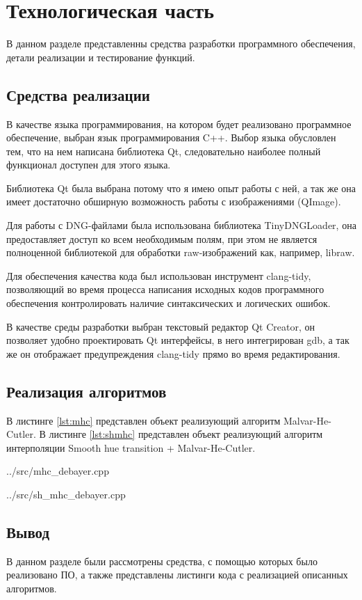 \chapter{Технологическая часть}

В данном разделе представленны средства разработки программного обеспечения, детали реализации и тестирование функций.

\section{Средства реализации}

В качестве языка программирования, на котором будет реализовано программное обеспечение, выбран язык программирования C++. Выбор языка обусловлен тем, что на нем написана библиотека Qt, следовательно наиболее полный функционал доступен для этого языка. 

Библиотека Qt была выбрана потому что я имею опыт работы с ней, а так же она имеет достаточно обширную возможность работы с изображениями (QImage).

Для работы с DNG-файлами была использована библиотека TinyDNGLoader, она предоставляет доступ ко всем необходимым полям, при этом не является полноценной библиотекой для обработки raw-изображений как, например, libraw.

Для обеспечения качества кода был использован инструмент clang-tidy, позволяющий во время процесса написания исходных кодов программного обеспечения контролировать наличие синтаксических и логических ошибок.

В качестве среды разработки выбран текстовый редактор Qt Creator, он позволяет удобно проектировать Qt интерфейсы, в него интегрирован gdb, а так же он отображает предупреждения clang-tidy прямо во время редактирования.

\section{Реализация алгоритмов}

В листинге \ref{lst:mhc} представлен объект реализующий алгоритм Malvar-He-Cutler. В листинге \ref{lst:shmhc} представлен объект реализующий алгоритм интерполяции Smooth hue transition + Malvar-He-Cutler.

\begin{lstinputlisting}[
	caption={Malvar-He-Cutler.},
	label={lst:mhc},
	style={customc},
	]{../src/mhc_debayer.cpp}
\end{lstinputlisting}

\begin{lstinputlisting}[
	caption={Smooth hue transition + Malvar-He-Cutler.},
	label={lst:shmhc},
	style={customc},
	]{../src/sh_mhc_debayer.cpp}
\end{lstinputlisting}


\section*{Вывод}

В данном разделе были рассмотрены средства, с помощью которых было реализовано ПО, а также представлены листинги кода с реализацией описанных алгоритмов.


